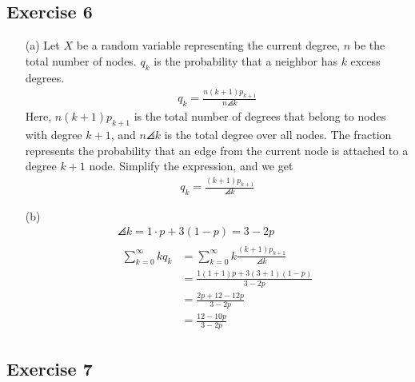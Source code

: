 \documentclass{article}
\begin{document}
\newpage

\subsection*{Exercise 6}

\begin{enumerate}
  \item[(a)]
  Let \( X \) be a random variable representing the current degree, \( n \) be
  the total number of nodes. \( q_k \) is the probability that a neighbor has \(
  k \) excess degrees.
  \begin{gather*}
    q_k = \frac{n (k + 1) p_{k + 1}}{n \angles{k}}
  \end{gather*}
  Here, \( n(k + 1) p_{k + 1} \) is the total number of degrees that belong to
  nodes with degree \( k + 1 \), and \( n \angles{k} \) is the total degree over
  all nodes. The fraction represents the probability that an edge from the
  current node is attached to a degree \( k + 1 \) node. Simplify the
  expression, and we get
  \begin{gather*}
    q_k = \frac{(k + 1) p_{k + 1}}{\angles{k}}
  \end{gather*}

  \item[(b)]
  \begin{gather*}
    \angles{k} = 1 \cdot p + 3(1 - p) = 3 - 2p \\
    \begin{aligned}
      \sum_{k = 0}^{\infty} k q_k &= \sum_{k = 0}^{\infty} k \frac{(k + 1) p_{k + 1}}{\angles{k}} \\
      &= \frac{1(1 + 1)p + 3(3 + 1)(1 - p)}{3 - 2p} \\
      &= \frac{2p + 12 - 12p}{3 - 2p} \\
      &= \boxed{\frac{12 - 10p}{3 - 2p}}
    \end{aligned}
  \end{gather*}
\end{enumerate}

\newpage

\subsection*{Exercise 7}
\end{document}

